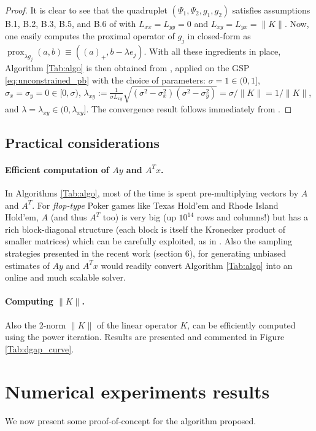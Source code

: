 \documentclass[a4paper,9pt]{extarticle}
\DeclareMathOperator{\prox}{prox}
\begin{document}
\begin{proof}
It is clear to see that the quadruplet $(\Psi_1, \Psi_2, g_1, g_2)$
satisfies assumptions B.1, B.2, B.3, B.5, and B.6 of
\cite{he2013accelerating} with $L_{xx} = L_{yy} = 0$ and $L_{xy} =
L_{yx} = \|K\|$. Now, one easily computes the proximal operator of
$g_j$ in closed-form as $\prox_{\lambda g_j}(a, b) \equiv ((a)_+,
b - \lambda e_j)$. With all these ingredients in place, Algorithm
\ref{Tab:algo} is then obtained from \cite[Algorithm
  T-BD]{he2013accelerating}, applied on the GSP
\eqref{eq:unconstrained_pb} with the choice of parameters: $\sigma = 1
\in (0, 1]$, $\sigma_x = \sigma_y = 0 \in [0, \sigma)$,
    $\lambda_{xy} := \frac{1}{\sigma L_{xy}}\sqrt{(\sigma^2 -
        \sigma_x^2)(\sigma^2 - \sigma_y^2)} = \sigma / \|K\| =
      1/\|K\|$, and $\lambda = \lambda_{xy} \in (0,
      \lambda_{xy}]$. The convergence result follows immediately from
  \cite[Theorem 4.2]{he2013accelerating}.
\end{proof}

\subsection{Practical considerations}
\paragraph*{Efficient computation of $Ay$ and $A^Tx$.}
In Algorithms \ref{Tab:algo}, most of the time is spent
pre-multiplying vectors by $A$ and $A^T$. For \textit{flop-type} Poker
games like Texas Hold'em and  Rhode Island Hold'em,
$A$ (and thus $A^T$ too)  is very big (up $10^{14}$ rows and columns!)
but has a rich block-diagonal structure (each block is itself the
Kronecker product of smaller matrices) which can be carefully
exploited, as in \cite{hoda2010smoothing}. Also the sampling
strategies presented in the recent work \cite{kroer2015} (section 6),
for generating unbiased estimates of $Ay$ and $A^Tx$ would readily
convert Algorithm \ref{Tab:algo} into an online and much scalable
solver.

\paragraph*{Computing $\|K\|$.}
Also the 2-norm $\|K\|$ of the linear operator $K$, can be efficiently
computed using the power iteration. Results are presented and
commented in Figure \ref{Tab:dgap_curve}.

\section{Numerical experiments results}
\label{sec:results}
We now present some proof-of-concept for the algorithm proposed.
\end{document}
